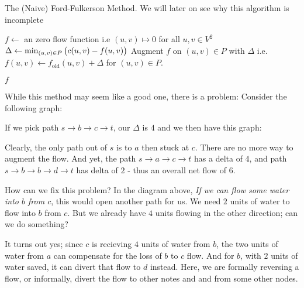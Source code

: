 \begin{algorithm}[H]
    \caption{The (Naive) Ford-Fulkerson Method. We will later on see why this algorithm is incomplete}
    \label{ch3:ford-fulkerson}

    \begin{algorithmic}[1]
        \State $f\gets$ an zero flow function \Comment i.e $(u,v)\mapsto 0$ for all $u,v\in V^2$
        \State $\Delta\gets \min_{(u,v)\in P} \del{c(u,v)-f(u,v)}$ 
        \State Augment $f$ on $(u,v)\in P$ with $\Delta$ \Comment i.e. $f(u,v)\gets f_{\text{old}}(u,v)+\Delta$ for $(u,v)\in P$. 
        \EndWhile

        \State \Return $f$ 
        \EndProcedure
    \end{algorithmic}
\end{algorithm}

While this method may seem like a good one, there is a problem:
Consider the following graph:

\begin{center}
\end{center}

If we pick path $s\to b \to c \to t$, our $\Delta$ is $4$ and 
we then have this graph:

\begin{center}
\end{center}

Clearly, the only path out of $s$ is to $a$ then stuck at $c$.
There are no more way to augment the flow. 
And yet, the path $s\to a\to c \to t$ has a delta of $4$, and path $s\to b \to b \to d \to t$ has delta of $2$ - thus an overall net flow of $6$.

How can we fix this problem? In the diagram above, \textit{If we can flow some water into $b$ from $c$}, this would open another path for us. 
We need $2$ units of water to flow into $b$ from $c$. 
But we already have $4$ units flowing in the other direction; can we do something?

It turns out yes; since $c$ is recieving $4$ units of water from $b$, the two units of water from $a$ can compensate for the loss of $b$ to $c$ flow.
And for $b$, with $2$ units of water saved, it can divert that flow to $d$ instead. 
Here, we are formally reversing a flow, or informally, divert the flow to other notes and and from some other nodes. 

